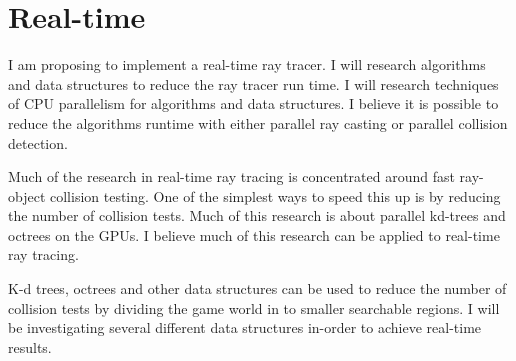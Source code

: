 \section{Real-time}
I am proposing to implement a real-time ray tracer.  I will research algorithms and data structures to reduce the ray tracer run time.  I will research techniques of CPU parallelism for algorithms and data structures.  I believe it is possible to reduce the algorithms runtime with either parallel ray casting or parallel collision detection.

Much of the research in real-time ray tracing is concentrated around fast ray-object collision testing.  One of the simplest ways to speed this up is by reducing the number of collision tests\cite{kd:2005}.
Much of this research is about parallel kd-trees and octrees on the GPUs\cite{kd:2007}\cite{fkd:2007}.  I believe much of this research can be applied to real-time ray tracing\cite{kd:2006}.

K-d trees, octrees and other data structures can be used to reduce the number of collision tests by dividing the game world in to smaller searchable regions.  I will be investigating several different data structures in-order to achieve real-time results.	
 


